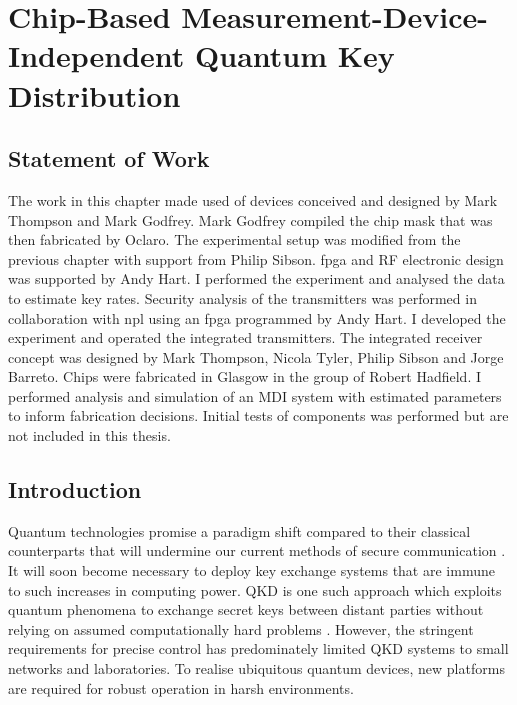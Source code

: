 %
%
\graphicspath{{./chapters/chapter04/fig04/}}

\let\textcircled=\pgftextcircled
\chapter[Chip-Based Measurement-Device-Independent QKD]{Chip-Based Measurement-Device-Independent Quantum Key Distribution}
\label{chap:mdiqkd}
\glsresetall

\section*{Statement of Work}

The work in this chapter made used of devices conceived and designed by Mark Thompson and Mark Godfrey. Mark Godfrey compiled the chip mask that was then fabricated by Oclaro. The experimental setup was modified from the previous chapter with support from Philip Sibson. \ac{fpga} and RF electronic design was supported by Andy Hart. I performed the experiment and analysed the data to estimate key rates. Security analysis of the transmitters was performed in collaboration with \acl{npl} using an \acs{fpga} programmed by Andy Hart. I developed the experiment and operated the integrated transmitters. The integrated receiver concept was designed by Mark Thompson, Nicola Tyler, Philip Sibson and Jorge Barreto. Chips were fabricated in Glasgow in the group of Robert Hadfield. I performed analysis and simulation of an \ac{MDI} system with estimated parameters to inform fabrication decisions. Initial tests of components was performed but are not included in this thesis.

\section{Introduction}

Quantum technologies promise a paradigm shift compared to their classical counterparts that will undermine our current methods of secure communication \cite{shor1994}. It will soon become necessary to deploy key exchange systems that are immune to such increases in computing power. \ac{QKD} is one such approach which exploits quantum phenomena to exchange secret keys between distant parties without relying on assumed computationally hard problems \cite{BB84, E91}. However, the stringent requirements for precise control has predominately limited \ac{QKD} systems to small networks and laboratories. To realise ubiquitous quantum devices, new platforms are required for robust operation in harsh environments. 

